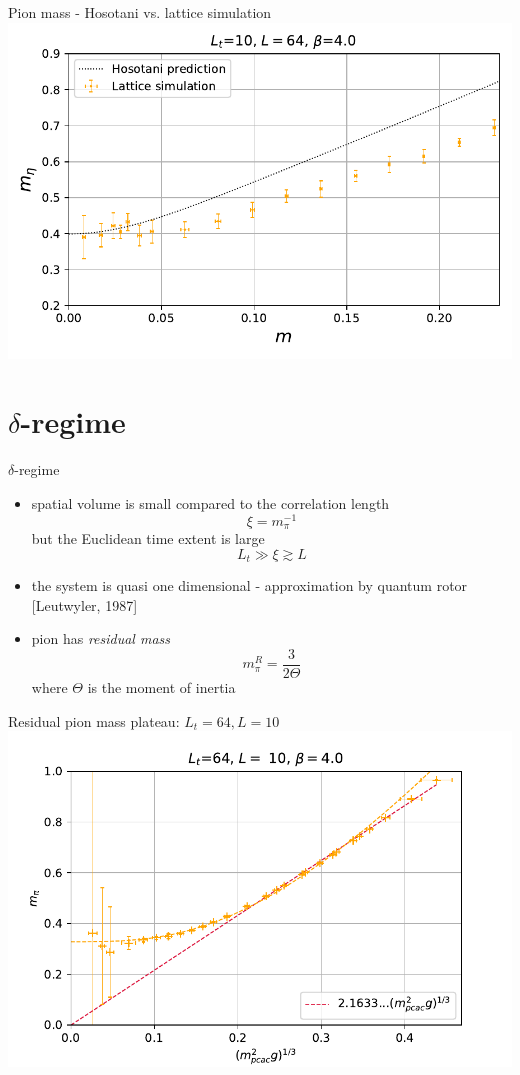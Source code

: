 \documentclass[english]{beamer}
\begin{document}
\begin{frame}{Pion mass - Hosotani vs. lattice simulation}
  \includegraphics[width=1\textwidth]{figs/Meta64x10FiniteT_Pt3}
\end{frame}


\section{$\delta$-regime}

\begin{frame}{$\delta$-regime}
  \begin{itemize}
    \item spatial volume is small compared to the correlation
      length
      \[
        \xi = m_\pi^{-1}
      \]
      but the Euclidean time extent is large
      \[
        L_t\gg \xi \gtrsim L
      \]
    \item the system is quasi one dimensional - approximation by
      quantum rotor [Leutwyler, 1987]
    \item pion has \textit{residual mass}
      \[
        m_\pi^R = \frac{3}{2\Theta}
      \]
      where $\Theta$ is the moment of inertia
  \end{itemize}
\end{frame}

\begin{frame}{Residual pion mass plateau: $L_t = 64, L = 10$}
  \includegraphics[width=1\textwidth]{figs/Mpi10x64}
\end{frame}
\end{document}
